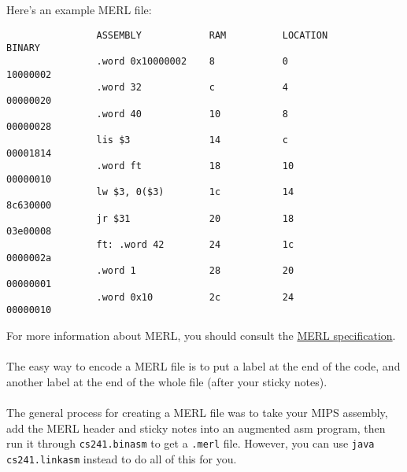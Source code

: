 \documentclass[]{article}
\theoremstyle{definition}
\newcommand{\lecture}[1]{\marginpar{{\footnotesize $\leftarrow$ \underline{#1}}}}
\begin{document}
			Here's an example MERL file:
			\begin{verbatim}
				ASSEMBLY            RAM          LOCATION          BINARY
				.word 0x10000002    8            0                 10000002
				.word 32            c            4                 00000020
				.word 40            10           8                 00000028
				lis $3              14           c                 00001814
				.word ft            18           10                00000010
				lw $3, 0($3)        1c           14                8c630000
				jr $31              20           18                03e00008
				ft: .word 42        24           1c                0000002a
				.word 1             28           20                00000001
				.word 0x10          2c           24                00000010
			\end{verbatim}
			\lecture{January 30, 2013}
			For more information about MERL, you should consult the \href{https://www.student.cs.uwaterloo.ca/~cs241/merl/merl.html}{MERL specification}.
			\\ \\
			The easy way to encode a MERL file is to put a label at the end of the code, and another label at the end of the whole file (after your sticky notes).
			\\ \\
			The general process for creating a MERL file was to take your MIPS assembly, add the MERL header and sticky notes into an augmented asm program, then run it through \verb+cs241.binasm+ to get a \verb+.merl+ file. However, you can use \verb+java cs241.linkasm+ instead to do all of this for you.
\end{document}

